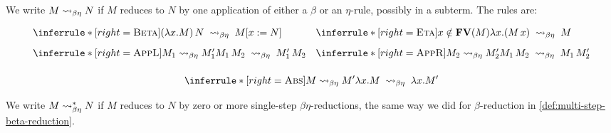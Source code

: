 \begin{definition}
We write $M \mathrel{\leadsto}_{\beta\eta} N$ if $M$ reduces to $N$ by one application
of either a $\beta$ or an $\eta$-rule, possibly in a subterm. The rules are:

\[
  \begin{array}{@{}l@{\quad}l@{}}
    \inferrule*[right=\textsc{Beta}]
    { }
    { (\lambda x. M)\,N \;\betared\; M[x := N] }
    &
      \inferrule*[right=\textsc{Eta}]
      { x \notin \FV{M} }
      { \lambda x.(M\,x) \;\betared\; M } \\[2ex]
    \inferrule*[right=\textsc{AppL}]
    { M_1 \betared M_1' }
    { M_1\,M_2 \;\betared\; M_1'\,M_2 }
    &
      \inferrule*[right=\textsc{AppR}]
      { M_2 \betared M_2' }
      { M_1\,M_2 \;\betared\; M_1\,M_2' } \\[2ex]
  \end{array}
\]
\[
  \inferrule*[right=\textsc{Abs}]
  { M \betared M' }
  { \lambda x.M \;\betared\; \lambda x.M' }
\]

\end{definition}

\begin{definition}
  We write $M \mathrel{\leadsto}^*_{\beta\eta} N$ if $M$ reduces to $N$ by zero or more single-step $\beta\eta$-reductions, the same way we did for $\beta$-reduction in  \ref{def:multi-step-beta-reduction}.
\end{definition}


